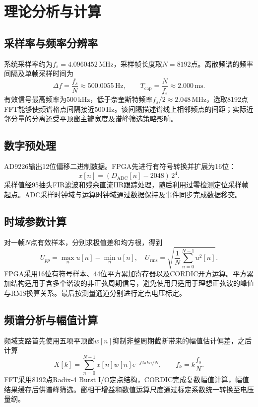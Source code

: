 \documentclass[UTF8,a4paper,12pt,oneside]{ctexart}
\begin{document}
\section{理论分析与计算}
\subsection{采样率与频率分辨率}
系统采样率约为$f_s=4.0960452\,\mathrm{MHz}$，采样帧长度取$N=8192$点。离散频谱的频率间隔及单帧采样时间为
\begin{equation}
 \Delta f=\frac{f_s}{N}\approx500.0055\,\mathrm{Hz},\qquad
 T_{\mathrm{cap}}=\frac{N}{f_s}\approx2.000\,\mathrm{ms}.
\end{equation}
有效信号最高频率为500\,kHz，低于奈奎斯特频率$f_s/2\approx2.048\,\mathrm{MHz}$，选取8192点FFT能够使频谱格点间隔接近500\,Hz。该间隔描述谱线上相邻频点的间距；实际近邻分量的分离还受平顶窗主瓣宽度及谱峰筛选策略影响。
\subsection{数字预处理}
AD9226输出12位偏移二进制数据。FPGA先进行有符号转换并扩展为16位：
\begin{equation}
 x[n]=(D_{\mathrm{ADC}}[n]-2048)\,2^4.
\end{equation}
采样值经95抽头FIR滤波和残余直流IIR跟踪处理，随后利用过零检测定位采样帧起点。ADC采样时钟域与运算时钟域通过数据保持及事件同步完成数据移交。
\subsection{时域参数计算}
对一帧$N$点有效样本，分别求极值差和均方根，得到
\begin{equation}
 U_{pp}=\max_n u[n]-\min_n u[n],\quad
 U_{\mathrm{rms}}=\sqrt{\frac1N\sum_{n=0}^{N-1}u^2[n]}.
\end{equation}
FPGA采用16位有符号样本、44位平方累加寄存器以及CORDIC开方运算。平方累加结构适用于含多个谐波的非正弦周期信号，避免使用只适用于理想正弦波的峰值与RMS换算关系。最后按测量通道分别进行定点电压标定。
\subsection{频谱分析与幅值计算}
频域支路首先使用五项平顶窗$w[n]$抑制非整周期截断带来的幅值估计偏差，之后计算
\begin{equation}
 X[k]=\sum_{n=0}^{N-1}x[n]w[n]e^{-j2\pi kn/N},\qquad f_k=k\frac{f_s}{N}.
\end{equation}
FFT采用8192点Radix-4 Burst I/O定点结构，CORDIC完成复数幅值计算，幅值结果缓存后供谱峰筛选。窗相干增益和数值运算尺度通过标定系数统一转换至电压量纲。
\end{document}
